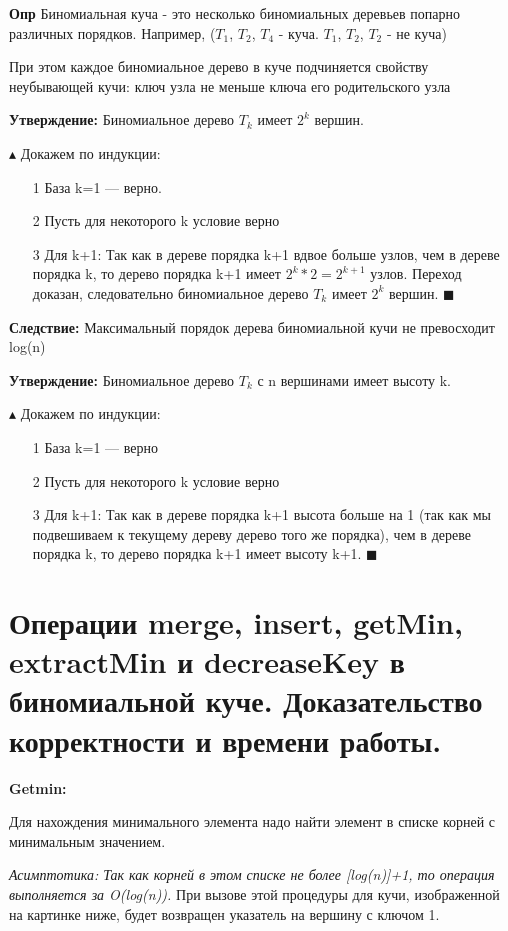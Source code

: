 \textbf{Опр} Биномиальная куча - это несколько биномиальных деревьев попарно различных порядков. Например, ($T_{1}$, $T_2$, $T_4$ - куча. $T_{1}$, $T_2$, $T_2$ - не куча)

При этом каждое биномиальное дерево в куче подчиняется свойству неубывающей кучи: ключ узла не меньше ключа его родительского узла

\textbf{Утверждение:} Биномиальное дерево $T_k$ имеет $2^k$ вершин.

$\blacktriangle$
Докажем по индукции:
\begin{itemize}
    \item[1] База k=1 — верно.
    \item[2] Пусть для некоторого k условие верно
    \item[3] Для k+1: Так как в дереве порядка k+1 вдвое больше узлов, чем в дереве порядка k, то дерево порядка k+1 имеет $2^{k}*2=2^{k+1}$ узлов. Переход доказан, следовательно биномиальное дерево $T_k$ имеет $2^{k}$ вершин.
    $\blacksquare$
\end{itemize}

\textbf{Следствие:} Максимальный порядок дерева биномиальной кучи не превосходит log(n)

\textbf{Утверждение:} Биномиальное дерево $T_k$ с n вершинами имеет высоту k.

$\blacktriangle$
Докажем по индукции:
\begin{itemize}
    \item[1] База k=1 — верно
    \item[2]  Пусть для некоторого k условие верно
     \item[3] Для k+1: Так как в дереве порядка k+1 высота больше на 1 (так как мы подвешиваем к текущему дереву дерево того же порядка), чем в дереве порядка k, то дерево порядка k+1 имеет высоту k+1.    $\blacksquare$
\end{itemize}

\section{Операции merge, insert, getMin, extractMin и decreaseKey в биномиальной куче.
Доказательство корректности и времени работы.}

\textbf{Getmin: }

Для нахождения минимального элемента надо найти элемент в списке корней с минимальным значением.

\textit{Асимптотика: Так как корней в этом списке не более [log(n)]+1, то операция выполняется за O(log(n)).}
При вызове этой процедуры для кучи, изображенной на картинке ниже, будет возвращен указатель на вершину с ключом 1.

